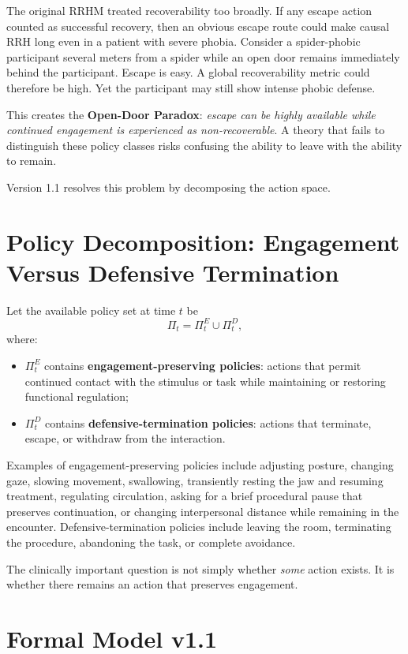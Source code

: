 \documentclass[11pt]{article}
\begin{document}
The original RRHM treated recoverability too broadly. If any escape action counted as successful recovery, then an obvious escape route could make causal RRH long even in a patient with severe phobia. Consider a spider-phobic participant several meters from a spider while an open door remains immediately behind the participant. Escape is easy. A global recoverability metric could therefore be high. Yet the participant may still show intense phobic defense.

This creates the \textbf{Open-Door Paradox}: \emph{escape can be highly available while continued engagement is experienced as non-recoverable}. A theory that fails to distinguish these policy classes risks confusing the ability to leave with the ability to remain.

Version 1.1 resolves this problem by decomposing the action space.

\section{Policy Decomposition: Engagement Versus Defensive Termination}

Let the available policy set at time $t$ be
\[
\Pi_t=\Pi_t^{E}\cup\Pi_t^{D},
\]
where:

\begin{itemize}[leftmargin=*]
\item $\Pi_t^{E}$ contains \textbf{engagement-preserving policies}: actions that permit continued contact with the stimulus or task while maintaining or restoring functional regulation;
\item $\Pi_t^{D}$ contains \textbf{defensive-termination policies}: actions that terminate, escape, or withdraw from the interaction.
\end{itemize}

Examples of engagement-preserving policies include adjusting posture, changing gaze, slowing movement, swallowing, transiently resting the jaw and resuming treatment, regulating circulation, asking for a brief procedural pause that preserves continuation, or changing interpersonal distance while remaining in the encounter. Defensive-termination policies include leaving the room, terminating the procedure, abandoning the task, or complete avoidance.

The clinically important question is not simply whether \emph{some} action exists. It is whether there remains an action that preserves engagement.

\section{Formal Model v1.1}
\end{document}
